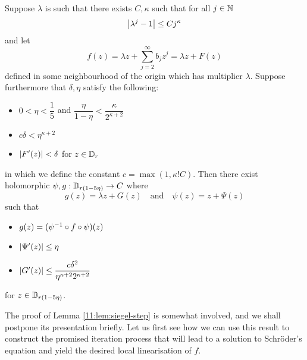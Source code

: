 \documentclass[../main.tex]{subfiles}
\begin{document}
\begin{lem}\label{11:lem:siegel-step}
Suppose $\lambda$ is such that there exists $C, \kappa$ such that for all $j \in \mathbb{N}$
\[
\left|\lambda^j - 1\right| \le C j^\kappa
\]
and let
\[
f(z) = \lambda z + \sum_{j=2}^\infty b_jz^j =\lambda z + F(z)
\]
defined in some neighbourhood of the origin which has multiplier $\lambda$.
Suppose furthermore that $\delta, \eta$ satisfy the following:

\begin{itemize}
    \item $0 < \eta < \dfrac{1}{5}$ and $\dfrac{\eta}{1-\eta} < \dfrac{\kappa}{2^{\kappa+2}}$
    \item $c \delta < \eta^{\kappa+2}$
    \item $\left|F'(z)\right| < \delta$ for $z \in \mathbb{D}_r$
\end{itemize}

in which we define the constant $c = \max(1, \kappa! C)$.
Then there exist holomorphic $\psi, g : \mathbb{D}_{r(1-5\eta)} \to C$ where
\[
    g(z) = \lambda z + G(z) \quad \text{and} \quad \psi(z) = z + \Psi(z)
\]
such that
\begin{itemize}
\item $g(z) = (\psi^{-1} \circ f \circ \psi)(z)$
\item $\left|\Psi'(z)\right| \le \eta$
\item $\left|G'(z)\right| \le \dfrac{c\delta^2}{\eta^{\kappa+2}2^{\kappa+2}}$
\end{itemize}
for $z \in \mathbb{D}_{r(1-5\eta)}$.
\end{lem}

The proof of Lemma \eqref{11:lem:siegel-step} is somewhat involved, and we shall postpone its presentation briefly. Let us first see how we can use this result to construct the promised iteration process that will lead to a solution to Schröder's equation and yield the desired local linearisation of $f$.
\end{document}
